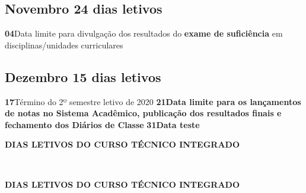 \documentclass[thesis]{hmcposter}
\begin{document}
\begin{poster}
\subsection{Novembro \hfill 24 dias letivos}\textbf{04}\qquad Data limite para divulgação dos resultados do \textbf{exame de suficiência} em disciplinas/unidades curriculares \subsection{Dezembro \hfill 15 dias letivos}\textbf{17}\qquad Término do 2º semestre letivo de 2020 \newline\textbf{21}\qquad \textbf{Data limite para os lançamentos de notas no Sistema Acadêmico, publicação dos resultados finais e fechamento dos Diários de Classe} \newline\textbf{31}\qquad \textbf{Data teste} \newpage
~
\vfill
\begin{center}
\large \textbf{DIAS LETIVOS DO CURSO TÉCNICO INTEGRADO}
\newline
\null
\newline
\begin{table}
\centering
{}
\end{table}
\newline
\null
\newline
\end{center}
\vfill
\null
\columnbreak
~
\vfill
\begin{center}
\large \textbf{DIAS LETIVOS DO CURSO TÉCNICO INTEGRADO}
\newline
\null
\newline
\begin{table}
\centering
{}
\end{table}
\end{center}
\end{poster}
\end{document}
